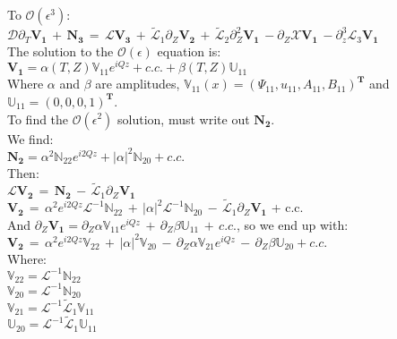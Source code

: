 \documentclass[letterpaper,12pt]{article}
\begin{document}
To $\mathcal{O}(\epsilon^3)$: \\

$\mathcal{D}\partial_T \mathbf{V_1} \, + \, \mathbf{N_3} \, = \, \mathcal{L} \mathbf{V_3} \, + \, \widetilde{\mathcal{L}}_1\partial_Z\mathbf{V_2} \, + \, \widetilde{\mathcal{L}}_2\partial_Z^2\mathbf{V_1} \, - \partial_Z\mathcal{X}\mathbf{V_1} \, - \partial_z^3\mathcal{L}_3\mathbf{V_1}$ \\

The solution to the $\mathcal{O}(\epsilon)$ equation is: \\

$\mathbf{V_1} = \alpha(T, Z) \mathbb{V}_{11} e^{i Q z} + c.c. + \beta(T, Z)\mathbb{U}_{11}$ \\

Where $\alpha$ and $\beta$ are amplitudes, $\mathbb{V}_{11}(x) = (\Psi_{11}, u_{11}, A_{11}, B_{11})^\mathbf{T}$ and $\mathbb{U}_{11} = (0, 0, 0, 1)^\mathbf{T}$. \\

To find the $\mathcal{O}(\epsilon^2)$ solution, must write out $\mathbf{N_2}$. \\

We find: \\

$\mathbf{N_2} = \alpha^2\mathbb{N}_{22} e^{i2Qz} + \left|\alpha\right|^2 \mathbb{N}_{20} + c.c.$ \\

Then: \\

$\mathcal{L}\mathbf{V_2} \, = \, \mathbf{N_2} \, - \, \widetilde{\mathcal{L}}_1 \partial_Z \mathbf{V_1}$ \\

$\mathbf{V_2} \, = \, \alpha^2 e^{i2Qz} \mathcal{L}^{-1}\mathbb{N}_{22} \, + \,  \left|\alpha\right|^2 \mathcal{L}^{-1} \mathbb{N}_{20}\, - \, \widetilde{\mathcal{L}}_1 \partial_Z \mathbf{V_1}$ + c.c.\\

And $\partial_Z \mathbf{V_1} = \partial_Z \alpha \mathbb{V}_{11} e^{i Q z} \, + \, \partial_Z \beta \mathbb{U}_{11} \, + \, c.c.$, so we end up with: \\

$\mathbf{V_2} \, = \, \alpha^2 e^{i2Qz} \mathbb{V}_{22} \, + \, \left|\alpha\right|^2 \mathbb{V}_{20} \, - \, \partial_Z \alpha \mathbb{V}_{21} e^{iQz} \, - \, \partial_Z \beta \mathbb{U}_{20} + c.c.$ \\

Where: \\

$\mathbb{V}_{22} = \mathcal{L}^{-1}\mathbb{N}_{22}$ \\

$\mathbb{V}_{20} = \mathcal{L}^{-1} \mathbb{N}_{20}$ \\

$\mathbb{V}_{21} = \mathcal{L}^{-1} \widetilde{\mathcal{L}}_1 \mathbb{V}_{11}$ \\

$\mathbb{U}_{20} = \mathcal{L}^{-1} \widetilde{\mathcal{L}}_1 \mathbb{U}_{11}$ \\





\end{document}
